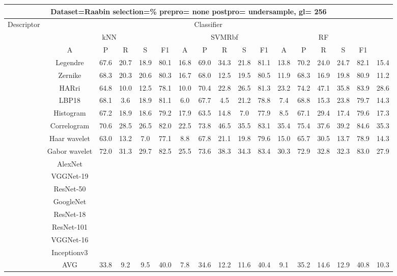 \documentclass[12pt,italian]{article}
\begin{document}
\begin{tiny}
\begin{longtable}{lcccccccccccccccc}
\toprule
\multicolumn{16}{c}{Dataset=Raabin selection=\% prepro= none postpro= undersample, gl= 256} \\ 
\toprule
Descriptor & \multicolumn{15}{c}{Classifier} \\ 
& \multicolumn{5}{c}{kNN} & \multicolumn{5}{c}{SVMRbf} & \multicolumn{5}{c}{RF} \\ 
& A & P & R & S & F1 & A & P & R & S & F1 & A & P & R & S & F1 \\ 
\midrule
& Legendre & 67.6 & 20.7 & 18.9 & 80.1 & 16.8 & 69.0 & 34.3 & 21.8 & 81.1 & 13.8 & 70.2 & 24.0 & 24.7 & 82.1 & 15.4 \\ 
& Zernike & 68.3 & 20.3 & 20.6 & 80.3 & 16.7 & 68.0 & 12.5 & 19.5 & 80.5 & 11.9 & 68.3 & 16.9 & 19.8 & 80.9 & 11.2 \\ 
& HARri & 64.8 & 10.0 & 12.5 & 78.1 & 10.0 & 70.4 & 22.8 & 26.5 & 81.3 & 23.2 & 74.2 & 47.1 & 35.8 & 83.9 & 28.6 \\ 
& LBP18 & 68.1 &  3.6 & 18.9 & 81.1 &  6.0 & 67.7 &  4.5 & 21.2 & 78.8 &  7.4 & 68.8 & 15.3 & 23.8 & 79.7 & 14.3 \\ 
& Histogram & 67.2 & 18.9 & 18.6 & 79.2 & 17.9 & 63.5 & 14.8 &  7.0 & 77.9 &  8.5 & 67.1 & 29.4 & 17.4 & 79.6 & 17.3 \\ 
& Correlogram & 70.6 & 28.5 & 26.5 & 82.0 & 22.5 & 73.8 & 46.5 & 35.5 & 83.1 & 35.4 & 75.4 & 37.6 & 39.2 & 84.6 & 35.3 \\ 
& Haar wavelet & 63.0 & 13.2 &  7.0 & 77.1 &  8.8 & 67.8 & 21.1 & 19.8 & 79.6 & 15.0 & 65.7 & 30.5 & 13.7 & 78.9 & 14.3 \\ 
& Gabor wavelet & 72.0 & 31.3 & 29.7 & 82.5 & 25.5 & 73.6 & 38.3 & 34.3 & 83.4 & 30.3 & 72.9 & 32.8 & 32.3 & 83.0 & 27.9 \\ 
& AlexNet \\ 
& VGGNet-19 \\ 
& ResNet-50 \\ 
& GoogleNet \\ 
& ResNet-18 \\ 
& ResNet-101 \\ 
& VGGNet-16 \\ 
& Inceptionv3 \\ 
\hline
& AVG & 33.8 &  9.2 &  9.5 & 40.0 &  7.8 & 34.6 & 12.2 & 11.6 & 40.4 &  9.1 & 35.2 & 14.6 & 12.9 & 40.8 & 10.3 \\ 
\hline
\bottomrule
\end{longtable} 


\end{tiny}
\end{document}
